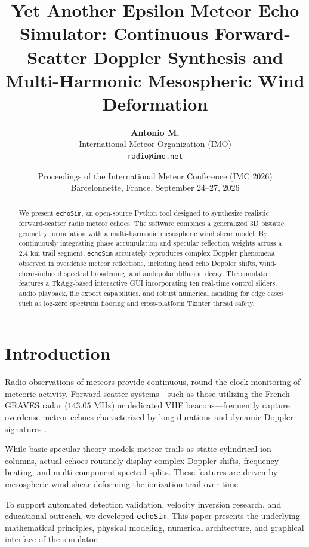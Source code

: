 \documentclass[10pt,twocolumn,a4paper]{article}
\title{\textbf{Yet Another Epsilon Meteor Echo Simulator: Continuous Forward-Scatter Doppler Synthesis and Multi-Harmonic Mesospheric Wind Deformation}}
\author{
    \textbf{Antonio M.}\\
    International Meteor Organization (IMO)\\
    \texttt{radio@imo.net}
}
\date{Proceedings of the International Meteor Conference (IMC 2026)\\Barcelonnette, France, September 24--27, 2026}
\begin{document}
\maketitle

\begin{abstract}
We present \texttt{echoSim}, an open-source Python tool designed to synthesize realistic forward-scatter radio meteor echoes. The software combines a generalized 3D bistatic geometry formulation with a multi-harmonic mesospheric wind shear model. By continuously integrating phase accumulation and specular reflection weights across a $2.4\text{ km}$ trail segment, \texttt{echoSim} accurately reproduces complex Doppler phenomena observed in overdense meteor reflections, including head echo Doppler shifts, wind-shear-induced spectral broadening, and ambipolar diffusion decay. The simulator features a TkAgg-based interactive GUI incorporating ten real-time control sliders, audio playback, file export capabilities, and robust numerical handling for edge cases such as log-zero spectrum flooring and cross-platform Tkinter thread safety.
\end{abstract}

\section{Introduction}
Radio observations of meteors provide continuous, round-the-clock monitoring of meteoric activity. Forward-scatter systems---such as those utilizing the French GRAVES radar ($143.05\text{ MHz}$) or dedicated VHF beacons---frequently capture overdense meteor echoes characterized by long durations and dynamic Doppler signatures \cite{mckinley1961, wissez2014}.

While basic specular theory models meteor trails as static cylindrical ion columns, actual echoes routinely display complex Doppler shifts, frequency beating, and multi-component spectral splits. These features are driven by mesospheric wind shear deforming the ionization trail over time \cite{lamy2015}.

To support automated detection validation, velocity inversion research, and educational outreach, we developed \texttt{echoSim}. This paper presents the underlying mathematical principles, physical modeling, numerical architecture, and graphical interface of the simulator.
\end{document}
